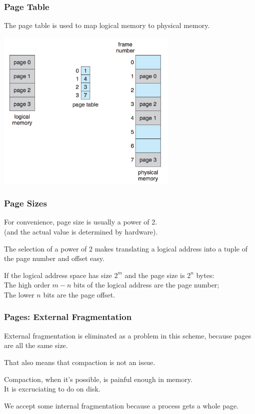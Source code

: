 \begin{frame}
\frametitle{Page Table}

The page table is used to map logical memory to physical memory.

\begin{center}
\includegraphics[width=0.65\textwidth]{images/page-table-mapping.png}
\end{center}

\end{frame}


\begin{frame}
\frametitle{Page Sizes}

For convenience, page size is usually a power of 2.\\
\quad (and the actual value is determined by hardware). 

The selection of a power of 2 makes translating a logical address into a tuple of the page number and offset easy. 

If the logical address space has size $2^{m}$ and the page size is $2^{n}$ bytes:\\
\quad The high order $m - n$ bits of the logical address are the page number;\\
\quad The lower $n$ bits are the page offset. 


\end{frame}

\begin{frame}
\frametitle{Pages: External Fragmentation}

External fragmentation is eliminated as a problem in this scheme, because pages are all the same size. 

That also means that compaction is not an issue. 

Compaction, when it's possible, is painful enough in memory. \\
\quad It is excruciating to do on disk. 

We accept some internal fragmentation because a process gets a whole page. 


\end{frame}

